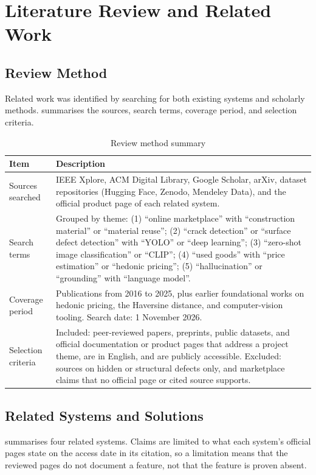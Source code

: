 
\chapter{Literature Review and Related Work}
\label{chap:literature}

\section{Review Method}
Related work was identified by searching for both existing systems and scholarly
methods.  summarises the sources, search terms, coverage
period, and selection criteria.

\begin{table}[H]
\centering
\caption{Review method summary}
\label{tab:review-method}
\begin{tabularx}{\textwidth}{@{}p{}X@{}}
\toprule
\textbf{Item} & \textbf{Description} \\
\midrule
Sources searched & IEEE Xplore, ACM Digital Library, Google Scholar, arXiv, dataset repositories (Hugging Face, Zenodo, Mendeley Data), and the official product page of each related system. \\
Search terms & Grouped by theme: (1) ``online marketplace'' with ``construction material'' or ``material reuse''; (2) ``crack detection'' or ``surface defect detection'' with ``YOLO'' or ``deep learning''; (3) ``zero-shot image classification'' or ``CLIP''; (4) ``used goods'' with ``price estimation'' or ``hedonic pricing''; (5) ``hallucination'' or ``grounding'' with ``language model''. \\
Coverage period & Publications from 2016 to 2025, plus earlier foundational works on hedonic pricing, the Haversine distance, and computer-vision tooling. Search date: 1 November 2026. \\
Selection criteria & Included: peer-reviewed papers, preprints, public datasets, and official documentation or product pages that address a project theme, are in English, and are publicly accessible. Excluded: sources on hidden or structural defects only, and marketplace claims that no official page or cited source supports. \\
\bottomrule
\end{tabularx}
\end{table}

\section{Related Systems and Solutions }
 summarises four related systems. Claims are limited to
what each system's official pages state on the access date in its citation, so a
limitation means that the reviewed pages do not document a feature, not that the
feature is proven absent.

